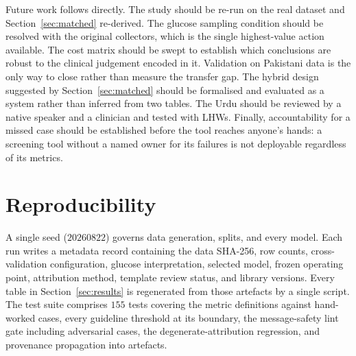 \documentclass[journal]{IEEEtran}
\begin{document}
Future work follows directly. The study should be re-run on the real dataset and
Section~\ref{sec:matched} re-derived. The glucose sampling condition should be
resolved with the original collectors, which is the single highest-value action
available. The cost matrix should be swept to establish which conclusions are
robust to the clinical judgement encoded in it. Validation on Pakistani data is
the only way to close rather than measure the transfer gap. The hybrid design
suggested by Section~\ref{sec:matched} should be formalised and evaluated as a
system rather than inferred from two tables. The Urdu should be reviewed by a
native speaker and a clinician and tested with LHWs. Finally, accountability for
a missed case should be established before the tool reaches anyone's hands: a
screening tool without a named owner for its failures is not deployable
regardless of its metrics.

\section*{Reproducibility}
A single seed ($20260822$) governs data generation, splits, and every model.
Each run writes a metadata record containing the data SHA-256, row counts,
cross-validation configuration, glucose interpretation, selected model, frozen
operating point, attribution method, template review status, and library
versions. Every table in Section~\ref{sec:results} is regenerated from those
artefacts by a single script. The test suite comprises $155$ tests covering the
metric definitions against hand-worked cases, every guideline threshold at its
boundary, the message-safety lint gate including adversarial cases, the
degenerate-attribution regression, and provenance propagation into artefacts.



\end{document}
